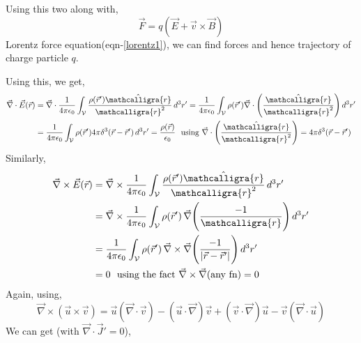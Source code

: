 \documentclass{article}
\newcommand{\scriptr}{\mathord{\mathcalligra{r}}}
\begin{document}
Using this two along with,
\begin{equation}
    \vec{F}=q(\vec{E}+\vec{v}\times \vec{B})
    \label{lorentz1}
\end{equation}
Lorentz force equation(eqn-\ref{lorentz1}), we can find forces and hence trajectory of charge particle $q$.

Using this, we get,
\begin{equation}
    \begin{split}
        \vec{\nabla}\cdot \vec{E}(\vec{r}) & = \vec{\nabla}\cdot \frac{1}{4\pi \epsilon_0} 
\int_{\mathcal{V}} \frac{\rho(\vec{r}')\hat{\scriptr}}{\scriptr^2} \, d^3r' = \frac{1}{4\pi \epsilon_0} 
\int_{\mathcal{V}}\rho(\vec{r}') \vec{\nabla}\cdot \Bigg(\frac{\hat{\scriptr}}{\scriptr^2}\Bigg) \, d^3r'\\ 
& = \frac{1}{4\pi \epsilon_0} 
\int_{\mathcal{V}}\rho(\vec{r}') 4\pi \delta^3(\vec{r}-\vec{r}') \, d^3r' = \frac{\rho(\vec{r})}{\epsilon_0} \, \, \text{ using }\vec{\nabla}\cdot \Bigg(\frac{\hat{\scriptr}}{\scriptr^2}\Bigg)=4\pi \delta^3(\vec{r}-\vec{r}')
    \end{split}
\label{gauss_1}
\end{equation}
Similarly,
\begin{equation}
    \begin{split}
        \vec{\nabla}\times \vec{E}(\vec{r}) & = \vec{\nabla}\times \frac{1}{4\pi \epsilon_0} 
\int_{\mathcal{V}} \frac{\rho(\vec{r}')\hat{\scriptr}}{\scriptr^2} \, d^3r'\\ 
& = \vec{\nabla}\times \frac{1}{4\pi \epsilon_0} 
\int_{\mathcal{V}} \rho(\vec{r}')\, \vec{\nabla} \Bigg(\frac{-1}{\scriptr}\Bigg) \, d^3r'\\ 
& =  \frac{1}{4\pi \epsilon_0} 
\int_{\mathcal{V}} \rho(\vec{r}')\, \vec{\nabla}\times\vec{\nabla} \Bigg(\frac{-1}{|\vec{r}-\vec{r}'|}\Bigg) \, d^3r'\\ 
& = 0  \, \, \text{ using the fact }\vec{\nabla}\times\vec{\nabla}(\text{any fn})=0
    \end{split}
\label{curlE_1}
\end{equation}
Again, using,
\begin{equation}
    \vec{\nabla}\times (\vec{u}\times \vec{v})=\vec{u}(\vec{\nabla}\cdot \vec{v}) - (\vec{u}\cdot \vec{\nabla})\vec{v} + (\vec{v}\cdot \vec{\nabla})\vec{u} - \vec{v}(\vec{\nabla}\cdot \vec{u}) 
\end{equation}
We can get (with $\vec{\nabla}\cdot \vec{J}'=0$),
\end{document}
